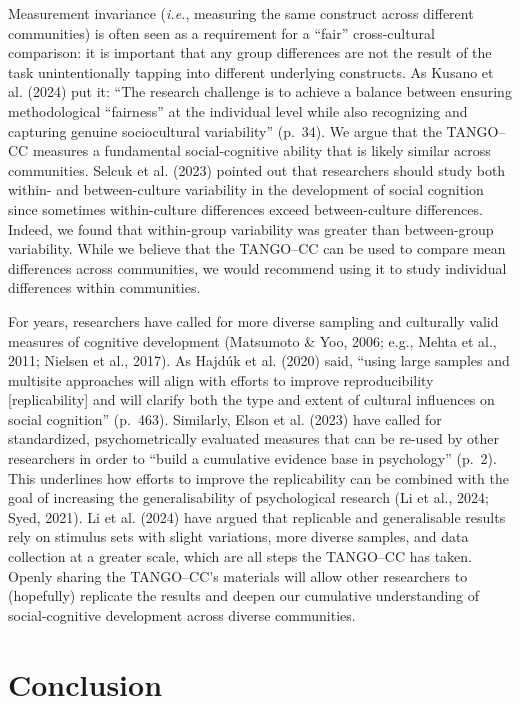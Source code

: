 \documentclass[
  man,floatsintext]{apa7}
\begin{document}
Measurement invariance (\emph{i.e.}, measuring the same construct across different communities) is often seen as a requirement for a ``fair'' cross-cultural comparison: it is important that any group differences are not the result of the task unintentionally tapping into different underlying constructs.
As Kusano et al. (2024) put it: ``The research challenge is to achieve a balance between ensuring methodological ``fairness'' at the individual level while also recognizing and capturing genuine sociocultural variability'' (p.~34).
We argue that the TANGO--CC measures a fundamental social-cognitive ability that is likely similar across communities.
Selcuk et al. (2023) pointed out that researchers should study both within- and between-culture variability in the development of social cognition since sometimes within-culture differences exceed between-culture differences.
Indeed, we found that within-group variability was greater than between-group variability.
While we believe that the TANGO--CC can be used to compare mean differences across communities, we would recommend using it to study individual differences within communities.

For years, researchers have called for more diverse sampling and culturally valid measures of cognitive development (Matsumoto \& Yoo, 2006; e.g., Mehta et al., 2011; Nielsen et al., 2017).
As Hajdúk et al. (2020) said, ``using large samples and multisite approaches will align with efforts to improve reproducibility {[}replicability{]} and will clarify both the type and extent of cultural influences on social cognition'' (p.~463).
Similarly, Elson et al. (2023) have called for standardized, psychometrically evaluated measures that can be re-used by other researchers in order to ``build a cumulative evidence base in psychology'' (p.~2).
This underlines how efforts to improve the replicability can be combined with the goal of increasing the generalisability of psychological research (Li et al., 2024; Syed, 2021).
Li et al. (2024) have argued that replicable and generalisable results rely on stimulus sets with slight variations, more diverse samples, and data collection at a greater scale, which are all steps the TANGO--CC has taken.
Openly sharing the TANGO--CC's materials will allow other researchers to (hopefully) replicate the results and deepen our cumulative understanding of social-cognitive development across diverse communities.

\section{Conclusion}\label{conclusion}
\end{document}
